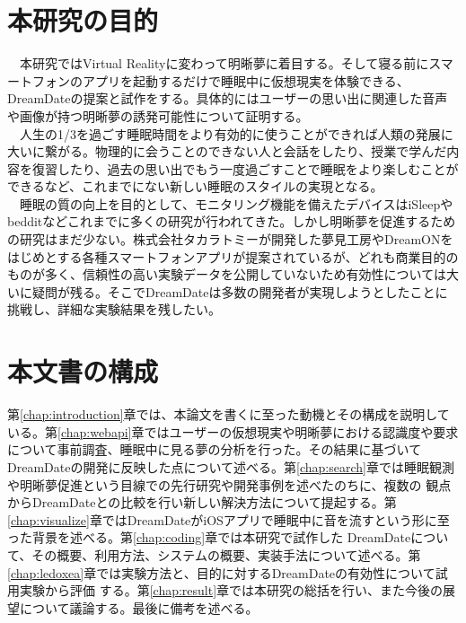 \section{本研究の目的}
　本研究ではVirtual Realityに変わって明晰夢に着目する。そして寝る前にスマートフォンのアプリを起動するだけで睡眠中に仮想現実を体験できる、DreamDateの提案と試作をする。具体的にはユーザーの思い出に関連した音声や画像が持つ明晰夢の誘発可能性について証明する。\\
　人生の1/3を過ごす睡眠時間をより有効的に使うことができれば人類の発展に大いに繋がる。物理的に会うことのできない人と会話をしたり、授業で学んだ内容を復習したり、過去の思い出でもう一度過ごすことで睡眠をより楽しむことができるなど、これまでにない新しい睡眠のスタイルの実現となる。\\
　睡眠の質の向上を目的として、モニタリング機能を備えたデバイスはiSleep\cite{iSleep}やbeddit\cite{beddit}などこれまでに多くの研究が行われてきた。しかし明晰夢を促進するための研究はまだ少ない。株式会社タカラトミーが開発した夢見工房\cite{takaratomi}やDreamON\cite{dreamOn}をはじめとする各種スマートフォンアプリが提案されているが、どれも商業目的のものが多く、信頼性の高い実験データを公開していないため有効性については大いに疑問が残る。そこでDreamDateは多数の開発者が実現しようとしたことに挑戦し、詳細な実験結果を残したい。

\section{本文書の構成}
第\ref{chap:introduction}章では、本論文を書くに至った動機とその構成を説明している。第\ref{chap:webapi}章ではユーザーの仮想現実や明晰夢における認識度や要求について事前調査、睡眠中に見る夢の分析を行った。その結果に基づいてDreamDateの開発に反映した点について述べる。第\ref{chap:search}章では睡眠観測や明晰夢促進という目線での先行研究や開発事例を述べたのちに、複数の 観点からDreamDateとの比較を行い新しい解決方法について提起する。第\ref{chap:visualize}章ではDreamDateがiOSアプリで睡眠中に音を流すという形に至った背景を述べる。第\ref{chap:coding}章では本研究で試作した DreamDateについて、その概要、利用方法、システムの概要、実装手法について述べる。第\ref{chap:ledoxea}章では実験方法と、目的に対するDreamDateの有効性について試用実験から評価 する。第\ref{chap:result}章では本研究の総括を行い、また今後の展望について議論する。最後に備考を述べる。
